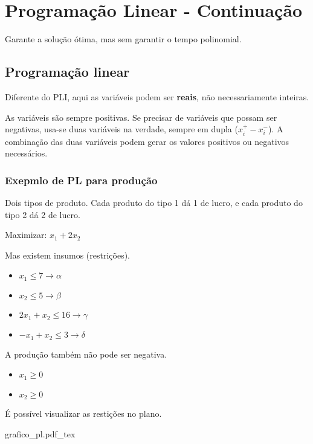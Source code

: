 \chapter{Programação Linear - Continuação}

Garante a solução ótima, mas sem garantir o tempo polinomial.

\section{Programação linear}

Diferente do PLI, aqui as variáveis podem ser \textbf{reais}, não necessariamente inteiras.

As variáveis são sempre positivas. Se precisar de variáveis que possam ser negativas, usa-se duas variáveis na verdade, sempre em dupla ($x_i^+ - x_i^-$). A combinação das duas variáveis podem gerar os valores positivos ou negativos necessários.

\subsection{Exepmlo de PL para produção}

Dois tipos de produto. Cada produto do tipo 1 dá 1 de lucro, e cada produto do tipo 2 dá 2 de lucro.

Maximizar: $x_1 + 2x_2$

Mas existem insumos (restrições).

\begin{itemize}
    \item $x_1 \leq 7 \to \alpha$
    \item $x_2 \leq 5 \to \beta$
    \item $2x_1 + x_2 \leq 16 \to \gamma$
    \item $-x_1 + x_2 \leq 3 \to \delta$
\end{itemize}

A produção também não pode ser negativa.

\begin{itemize}
    \item $x_1 \geq 0$
    \item $x_2 \geq 0$
\end{itemize}

É possível visualizar as restições no plano.

\begin{example}
    \begin{center}
        \def\svgwidth{.75\linewidth}
        {grafico_pl.pdf_tex}
    \end{center}
\end{example}

